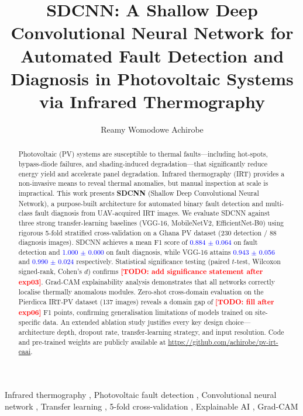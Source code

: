 \documentclass[5p,times,twocolumn]{elsarticle}
\newcommand{\todo}[1]{\textcolor{red}{\textbf{[TODO: #1]}}}
\newcommand{\numres}[1]{\textcolor{blue}{#1}}  %
\begin{document}
\begin{frontmatter}

\title{SDCNN: A Shallow Deep Convolutional Neural Network for Automated
       Fault Detection and Diagnosis in Photovoltaic Systems via
       Infrared Thermography}

\author[1]{Reamy Womodowe Achirobe}

\address[1]{\todo{Department, Institution, City, Country}}

\begin{abstract}
Photovoltaic (PV) systems are susceptible to thermal faults---including
hot-spots, bypass-diode failures, and shading-induced degradation---that
significantly reduce energy yield and accelerate panel degradation.
Infrared thermography (IRT) provides a non-invasive means to reveal
thermal anomalies, but manual inspection at scale is impractical.
This work presents \textbf{SDCNN} (Shallow Deep Convolutional Neural Network),
a purpose-built architecture for automated binary fault detection and
multi-class fault diagnosis from UAV-acquired IRT images.
We evaluate SDCNN against three strong transfer-learning baselines
(VGG-16, MobileNetV2, EfficientNet-B0) using rigorous 5-fold stratified
cross-validation on a Ghana PV dataset (230 detection / 88 diagnosis images).
SDCNN achieves a mean F1 score of \numres{0.884 $\pm$ 0.064} on fault
detection and \numres{1.000 $\pm$ 0.000} on fault diagnosis,
while VGG-16 attains \numres{0.943 $\pm$ 0.056} and \numres{0.990 $\pm$ 0.024}
respectively.
Statistical significance testing (paired $t$-test, Wilcoxon signed-rank,
Cohen's $d$) confirms \todo{add significance statement after exp03}.
Grad-CAM explainability analysis demonstrates that all networks correctly
localise thermally anomalous modules.
Zero-shot cross-domain evaluation on the Pierdicca IRT-PV dataset
(137 images) reveals a domain gap of \todo{fill after exp06} F1 points,
confirming generalisation limitations of models trained on site-specific
data.
An extended ablation study justifies every key design choice---architecture
depth, dropout rate, transfer-learning strategy, and input resolution.
Code and pre-trained weights are publicly available at
\url{https://github.com/achirobe/pv-irt-eaai}.
\end{abstract}

\begin{keyword}
Infrared thermography \sep
Photovoltaic fault detection \sep
Convolutional neural network \sep
Transfer learning \sep
5-fold cross-validation \sep
Explainable AI \sep
Grad-CAM
\end{keyword}

\end{frontmatter}
\end{document}
